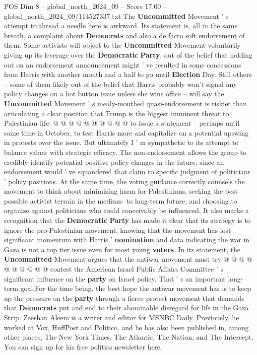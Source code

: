 \begin{textsample}{POS Dim 8 – global\_north\_2024\_09 – Score 17.00 – global\_north\_2024\_09/114527337.txt}
The \textbf{Uncommitted} Movement ' s attempt to thread a needle here is awkward.
Its statement is, all in the same breath, a complaint about \textbf{Democrats} and also a de facto soft endorsement of them.
Some activists will object to the \textbf{Uncommitted} Movement voluntarily giving up its leverage over the \textbf{Democratic} \textbf{Party}, out of the belief that holding out on an endorsement announcement might ' ve resulted in some concessions from Harris with another month and a half to go until \textbf{Election} Day.
Still others -- some of them likely out of the belief that Harris probably won't signal any policy changes on a hot button issue unless she wins office -- will say the \textbf{Uncommitted} Movement ' s mealy-mouthed quasi-endorsement is riskier than articulating a clear position that Trump is the biggest imminent threat to Palestinian life. @ @ @ @ @ @ @ @ @ @ to issue a statement -- perhaps until some time in October, to test Harris more and capitalize on a potential upswing in protests over the issue.
But ultimately I ' m sympathetic to its attempt to balance values with strategic efficacy.
The non-endorsement allows the group to credibly identify potential positive policy changes in the future, since an endorsement would ' ve squandered that claim to specific judgment of politicians ' policy positions.
At the same time, the voting guidance correctly counsels the movement to think about minimizing harm for Palestinians, seeking the best possible activist terrain in the medium- to long-term future, and choosing to organize against politicians who could conceivably be influenced.
It also marks a recognition that the \textbf{Democratic} \textbf{Party} has made it clear that its strategy is to ignore the pro-Palestinian movement, knowing that the movement has lost significant momentum with Harris ' \textbf{nomination} and data indicating the war in Gaza is not a top tier issue even for most young \textbf{voters}.
In its statement, the \textbf{Uncommitted} Movement argues that the antiwar movement must try @ @ @ @ @ @ @ @ @ @ contest the American Israel Public Affairs Committee ' s significant influence on the \textbf{party} on Israel policy.
That ' s an important long-term goal.For the time being, the best hope the antiwar movement has is to keep up the pressure on the \textbf{party} through a fierce protest movement that demands that \textbf{Democrats} put and end to their abominable disregard for life in the Gaza Strip.
Zeeshan Aleem is a writer and editor for MSNBC Daily.
Previously, he worked at Vox, HuffPost and Politico, and he has also been published in, among other places, The New York Times, The Atlantic, The Nation, and The Intercept.
You can sign up for his free politics newsletter here.

\end{textsample}
